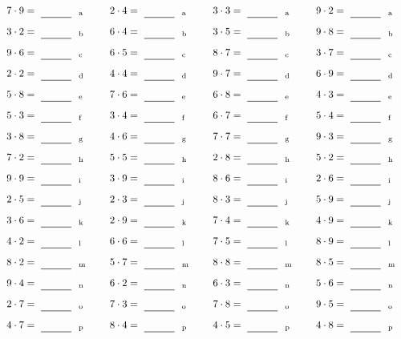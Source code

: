 \documentclass
[
  draft    = true,
  fontsize = 11pt,
  parskip  = half-
]
{scrartcl}
\begin{document}
\par\vfill\par
\begin{align*}
    \pline{7\cdot9}&=\rline{a}
  & \pline{2\cdot4}&=\rline{a}
  & \pline{3\cdot3}&=\rline{a}
  & \pline{9\cdot2}&=\rline{a} \\[1ex]
    \pline{3\cdot2}&=\rline{b}
  & \pline{6\cdot4}&=\rline{b}
  & \pline{3\cdot5}&=\rline{b}
  & \pline{9\cdot8}&=\rline{b} \\[1ex]
    \pline{9\cdot6}&=\rline{c}
  & \pline{6\cdot5}&=\rline{c}
  & \pline{8\cdot7}&=\rline{c}
  & \pline{3\cdot7}&=\rline{c} \\[1ex]
    \pline{2\cdot2}&=\rline{d}
  & \pline{4\cdot4}&=\rline{d}
  & \pline{9\cdot7}&=\rline{d}
  & \pline{6\cdot9}&=\rline{d} \\[1ex]
    \pline{5\cdot8}&=\rline{e}
  & \pline{7\cdot6}&=\rline{e}
  & \pline{6\cdot8}&=\rline{e}
  & \pline{4\cdot3}&=\rline{e} \\[1ex]
    \pline{5\cdot3}&=\rline{f}
  & \pline{3\cdot4}&=\rline{f}
  & \pline{6\cdot7}&=\rline{f}
  & \pline{5\cdot4}&=\rline{f} \\[1ex]
    \pline{3\cdot8}&=\rline{g}
  & \pline{4\cdot6}&=\rline{g}
  & \pline{7\cdot7}&=\rline{g}
  & \pline{9\cdot3}&=\rline{g} \\[1ex]
    \pline{7\cdot2}&=\rline{h}
  & \pline{5\cdot5}&=\rline{h}
  & \pline{2\cdot8}&=\rline{h}
  & \pline{5\cdot2}&=\rline{h} \\[1ex]
    \pline{9\cdot9}&=\rline{i}
  & \pline{3\cdot9}&=\rline{i}
  & \pline{8\cdot6}&=\rline{i}
  & \pline{2\cdot6}&=\rline{i} \\[1ex]
    \pline{2\cdot5}&=\rline{j}
  & \pline{2\cdot3}&=\rline{j}
  & \pline{8\cdot3}&=\rline{j}
  & \pline{5\cdot9}&=\rline{j} \\[1ex]
    \pline{3\cdot6}&=\rline{k}
  & \pline{2\cdot9}&=\rline{k}
  & \pline{7\cdot4}&=\rline{k}
  & \pline{4\cdot9}&=\rline{k} \\[1ex]
    \pline{4\cdot2}&=\rline{l}
  & \pline{6\cdot6}&=\rline{l}
  & \pline{7\cdot5}&=\rline{l}
  & \pline{8\cdot9}&=\rline{l} \\[1ex]
    \pline{8\cdot2}&=\rline{m}
  & \pline{5\cdot7}&=\rline{m}
  & \pline{8\cdot8}&=\rline{m}
  & \pline{8\cdot5}&=\rline{m} \\[1ex]
    \pline{9\cdot4}&=\rline{n}
  & \pline{6\cdot2}&=\rline{n}
  & \pline{6\cdot3}&=\rline{n}
  & \pline{5\cdot6}&=\rline{n} \\[1ex]
    \pline{2\cdot7}&=\rline{o}
  & \pline{7\cdot3}&=\rline{o}
  & \pline{7\cdot8}&=\rline{o}
  & \pline{9\cdot5}&=\rline{o} \\[1ex]
    \pline{4\cdot7}&=\rline{p}
  & \pline{8\cdot4}&=\rline{p}
  & \pline{4\cdot5}&=\rline{p}
  & \pline{4\cdot8}&=\rline{p}
\end{align*}
\end{document}
